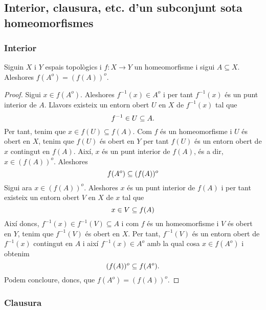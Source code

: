 \documentclass[../main.tex]{subfiles}
\begin{document}
\subsection{Interior, clausura, etc. d'un subconjunt sota homeomorfismes}

\subsubsection{Interior}

\begin{ter}
\label{ter:interiorhomeomorfismes} Siguin $X$ i $Y$ espais topològics i $f:X\rightarrow Y$ un homeomorfisme i sigui $A\subseteq X$. Aleshores $f(A^{o}) = (f(A))^{o}$.
\end{ter}
\begin{proof}
Sigui $x\in f(A^{o})$. Aleshores $f^{-1}(x)\in A^{o}$ i per tant $f^{-1}(x)$ és un punt interior de $A$. Llavors existeix un entorn obert $U$ en $X$ de $f^{-1}(x)$ tal que
\begin{equation}
    \notag
    f^{-1}\in U\subseteq A.
\end{equation}
Per tant, tenim que $x\in f(U)\subseteq f(A)$. Com $f$ és un homeomorfisme i $U$ és obert en $X$, tenim que $f(U)$ és obert en $Y$ per tant $f(U)$ és un entorn obert de $x$ contingut en $f(A)$. Així, $x$ és un punt interior de $f(A)$, és a dir, $x\in (f(A))^{o}$. Aleshores
\begin{equation}
    \notag
    f(A^{o})\subseteq (f(A))^{o}
\end{equation}
Sigui ara $x\in (f(A))^{o}$. Aleshores $x$ és un punt interior de $f(A)$ i per tant existeix un entorn obert $V$ en $X$ de $x$ tal que
\begin{equation}
    \notag
    x\in V\subseteq f(A)
\end{equation}
Així doncs, $f^{-1}(x)\in f^{-1}(V)\subseteq A$ i com $f$ és un homeomorfisme i $V$ és obert en $Y$, tenim que $f^{-1}(V)$ és obert en $X$. Per tant, $f^{-1}(V)$ és un entorn obert de $f^{-1}(x)$ contingut en $A$ i així $f^{-1}(x)\in A^{o}$ amb la qual cosa $x\in f(A^{o})$ i obtenim
\begin{equation}
    \notag
    (f(A))^{o}\subseteq f(A^{o}).
\end{equation}
Podem concloure, doncs, que $f(A^{o}) = (f(A))^{o}$.
\end{proof}

\subsubsection{Clausura}
\end{document}

